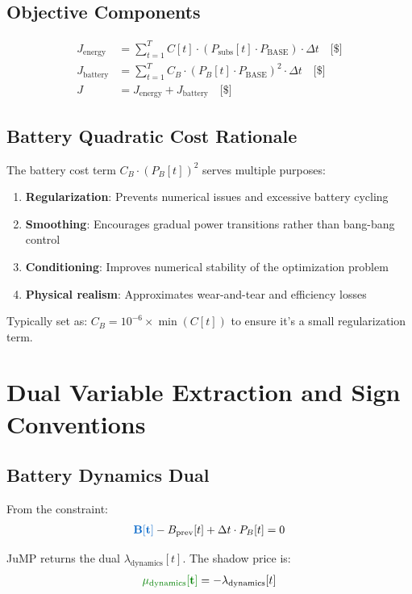 \documentclass[11pt]{article}
\newcommand{\blueB}[1]{\textcolor{bluevar}{\mathbf{#1}}}      %
\newcommand{\greenmu}[1]{\textcolor{greenvar}{\mathbf{#1}}}   %
\begin{document}
\subsection{Objective Components}
\begin{align}
J_{\text{energy}} &= \sum_{t=1}^T C[t] \cdot (P_{\text{subs}}[t] \cdot P_{\text{BASE}}) \cdot \Delta t \quad \text{[\$]} \\
J_{\text{battery}} &= \sum_{t=1}^T C_B \cdot (P_B[t] \cdot P_{\text{BASE}})^2 \cdot \Delta t \quad \text{[\$]} \\
J &= J_{\text{energy}} + J_{\text{battery}} \quad \text{[\$]}
\end{align}

\subsection{Battery Quadratic Cost Rationale}
The battery cost term $C_B \cdot (P_B[t])^2$ serves multiple purposes:
\begin{enumerate}
    \item \textbf{Regularization}: Prevents numerical issues and excessive battery cycling
    \item \textbf{Smoothing}: Encourages gradual power transitions rather than bang-bang control
    \item \textbf{Conditioning}: Improves numerical stability of the optimization problem
    \item \textbf{Physical realism}: Approximates wear-and-tear and efficiency losses
\end{enumerate}

Typically set as: $C_B = 10^{-6} \times \min(C[t])$ to ensure it's a small regularization term.

\section{Dual Variable Extraction and Sign Conventions}

\subsection{Battery Dynamics Dual}
From the constraint:
\begin{align}
\blueB{B[t]} - B_{\text{prev}}[t] + \Delta t \cdot P_B[t] = 0
\end{align}

JuMP returns the dual $\lambda_{\text{dynamics}}[t]$. The shadow price is:
\begin{align}
\greenmu{\mu_{\text{dynamics}}[t]} = -\lambda_{\text{dynamics}}[t]
\end{align}
\end{document}
